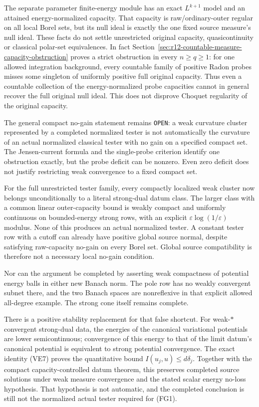 \documentclass[11pt,a4paper]{article}
\numberwithin{equation}{section}
\theoremstyle{definition}
\theoremstyle{remark}
\begin{document}
The separate parameter finite-energy module has an exact
$L^{k+1}$ model and an attained energy-normalized capacity.
That capacity is raw/ordinary-outer regular on all local Borel
sets, but its null ideal is exactly the one fixed source measure's
null ideal. These facts do not settle unrestricted original
capacity, quasicontinuity or classical polar-set equivalences.
In fact Section~\ref{sec:r12-countable-measure-capacity-obstruction}
proves a strict obstruction in every $n\geq q\geq1$: for one
allowed integration background, every countable family of
positive Radon probes misses some singleton of uniformly positive
full original capacity. Thus even a countable collection of the
energy-normalized probe capacities cannot in general recover the
full original null ideal. This does not disprove Choquet regularity
of the original capacity.

The general compact no-gain statement remains \texttt{OPEN}:
a weak curvature cluster represented by a completed normalized
tester is not automatically the curvature of an actual normalized
classical tester with no gain on a specified compact set.
The Jensen-current formula and the single-probe criterion identify
one obstruction exactly, but the probe deficit can be nonzero.
Even zero deficit does not justify restricting weak convergence
to a fixed compact set.

For the full unrestricted tester family, every compactly localized
weak cluster now belongs unconditionally to a literal strong-dual
datum class. The larger class with a common linear outer-capacity
bound is weakly compact and uniformly continuous on bounded-energy
strong rows, with an explicit $\varepsilon\log(1/\varepsilon)$
modulus. None of this produces an actual normalized tester.
A constant tester row with a cutoff can already have positive
global source normal, despite satisfying raw-capacity no-gain on
every Borel set. Global source compatibility is therefore not a
necessary local no-gain condition.

Nor can the argument be completed by asserting weak compactness
of potential energy balls in either new Banach norm. The pole
row has no weakly convergent subnet there, and the two Banach
spaces are nonreflexive in that explicit allowed all-degree
example. The strong cone itself remains complete.

There is a positive stability replacement for that false shortcut.
For weak-$*$ convergent strong-dual data, the energies of the
canonical variational potentials are lower semicontinuous;
convergence of this energy to that of the limit datum's canonical
potential is equivalent to strong potential convergence.
The exact identity (VE7) proves the
quantitative bound $I(u_j,u)\leq d\delta_j$.
Together with the compact capacity-controlled datum theorem,
this preserves completed source solutions under weak measure
convergence and the stated scalar energy no-loss hypothesis.
That hypothesis is not automatic, and the completed conclusion
is still not the normalized actual tester required for (FG1).
\end{document}
